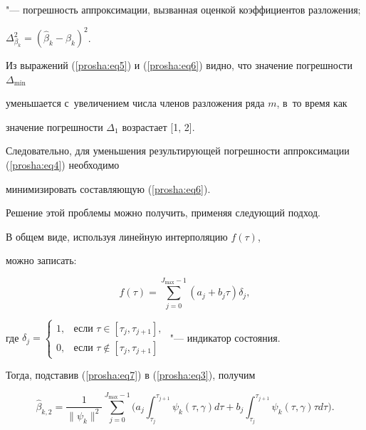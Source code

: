 "--- погрешность аппроксимации, вызванная оценкой коэффициентов разложения;

$\Delta _{\beta _k } ^2= ( \hat \beta  _k -\beta _k   )^2$.



Из выражений (\ref{prosha:eq5}) и (\ref{prosha:eq6}) видно, что значение погрешности $\Delta _{\min } $

уменьшается с~увеличением числа членов разложения ряда $m$, в~то время как

значение погрешности $\Delta _1 $ возрастает [1, 2].

Следовательно, для уменьшения результирующей погрешности аппроксимации (\ref{prosha:eq4}) необходимо

минимизировать составляющую (\ref{prosha:eq6}).



Решение этой проблемы можно получить,  применяя следующий подход.

В общем виде,  используя линейную интерполяцию $f ( \tau  )$,

можно записать:

\begin{equation}

\label{prosha:eq7}

f (\tau)=\sum\limits_{j=0}^{J_{\max } -1}  ( a_j +b_j \tau  )\delta _j ,

\end{equation}

где $\delta _j = \left\{ \begin{array}{cl}

 1, & \text{если } \tau \in [\tau _j, \tau _{j+1}], \\

 0, & \text{если } \tau \not\in [\tau _j, \tau _{j+1}]

\end{array} \right.$ "--- индикатор состояния.

Тогда, подставив (\ref{prosha:eq7}) в (\ref{prosha:eq3}), получим

\begin{equation}

\label{prosha:eq8}

\hat \beta_{k,2} =\frac{1}{ \| \psi _k \|^2}

\sum\limits_{j=0}^{J_{\max } -1}

 \biggl( a_j \int_{\tau_j }^{\tau _{j+1} }

\psi _k  (\tau , \gamma )d\tau  +b_j \int_{\tau _j }^{\tau _{j+1} } \psi _k  (\tau, \gamma ) \tau d\tau \biggr) .

\end{equation}



